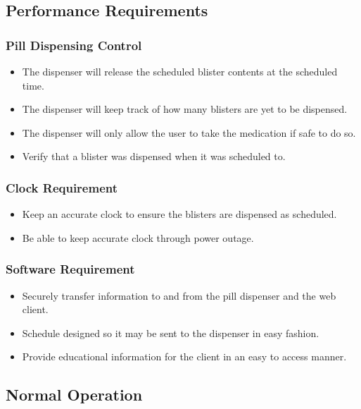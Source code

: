\documentclass[12pt,titlepage]{article}
\begin{document}
\subsection{Performance Requirements}
\subsubsection{Pill Dispensing Control}
\begin{itemize}
    \item The dispenser will release the scheduled blister contents at the scheduled time. 
    \item The dispenser will keep track of how many blisters are yet to be dispensed.
    \item The dispenser will only allow the user to take the medication if safe to do so.
    \item Verify that a blister was dispensed when it was scheduled to.
\end{itemize}
\subsubsection{Clock Requirement}
\begin{itemize}
    \item Keep an accurate clock to ensure the blisters are dispensed as scheduled.
    \item Be able to keep accurate clock through power outage.
\end{itemize}
\subsubsection{Software Requirement}
\begin{itemize}
    \item Securely transfer information to and from the pill dispenser and the web client.
    \item Schedule designed so it may be sent to the dispenser in easy fashion.
    \item Provide educational information for the client in an easy to access manner.
\end{itemize}

\subsection{Normal Operation}
\end{document}
